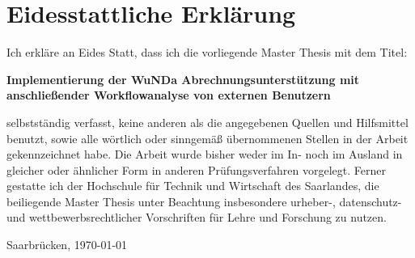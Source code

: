 \chapter*{Eidesstattliche Erklärung}

Ich erkläre an Eides Statt, dass ich die vorliegende Master Thesis mit dem Titel:

\hspace{1.0cm}

{  \bfseries Implementierung der WuNDa
Abrechnungsunterstützung mit anschließender
Workflowanalyse von externen Benutzern }

\hspace{1.0cm}

selbstständig verfasst, keine anderen als die angegebenen Quellen und Hilfsmittel
benutzt, sowie alle wörtlich oder sinngemäß übernommenen Stellen in der Arbeit
gekennzeichnet habe. Die Arbeit wurde bisher weder im In- noch im Ausland in
gleicher oder ähnlicher Form in anderen Prüfungsverfahren vorgelegt. Ferner gestatte
ich der Hochschule für Technik und Wirtschaft des Saarlandes, die beiliegende
Master Thesis unter Beachtung insbesondere urheber-, datenschutz- und
wettbewerbsrechtlicher Vorschriften für Lehre und Forschung zu nutzen.


\vfill

{\large Saarbrücken, { \today}}


